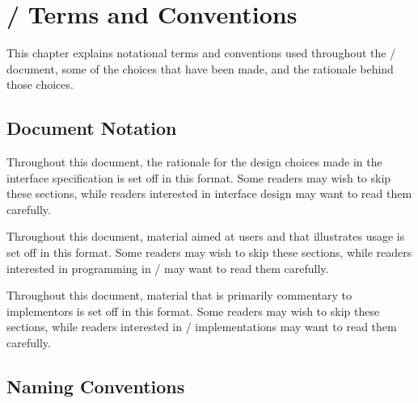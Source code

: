 \setcounter{topnumber}{3}%
\setcounter{totalnumber}{4}%


\chapter{\texorpdfstring{\MPI/}{MPI} Terms and Conventions}
\label{chap:terms}
\label{sec:terms}
\label{chap:terms-2}
\label{sec:terms-2}

This chapter explains notational terms and conventions used
throughout the
\MPI/
document, some of the choices that have been made,
and the rationale behind those choices.

\section{Document Notation}

\begin{rationale}
Throughout this document, the rationale for the design choices made in
the interface specification is set off in this format.  Some readers may
wish to skip these sections, while readers interested in interface design
may want to read them carefully.
\end{rationale}

\begin{users}
Throughout this document, material aimed at users and that illustrates
usage is set off in this format.  Some readers may
wish to skip these sections, while readers interested in programming in \MPI/
may want to read them carefully.
\end{users}

\begin{implementors}
Throughout this document, material that is primarily commentary to implementors
is set off in this format.  Some readers may
wish to skip these sections, while readers interested in
\MPI/ implementations may want to read them carefully.
\end{implementors}

\section{Naming Conventions}
\label{subsec:terms:naming}

